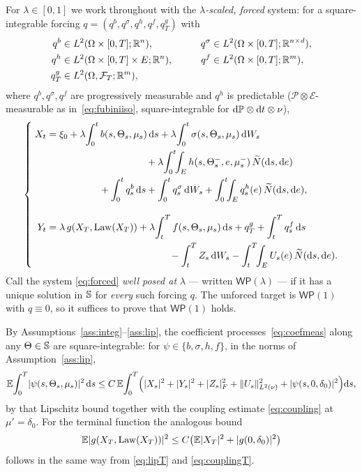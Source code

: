 For $\lambda\in[0,1]$ we work throughout with the \emph{$\lambda$-scaled, forced}
system: for a square-integrable forcing
$q=(q^b,q^\sigma,q^h,q^f,q^g_T)$ with
\[
\begin{aligned}
q^b&\in L^2(\Omega\times[0,T];\mathbb{R}^n),
&\qquad q^\sigma&\in L^2(\Omega\times[0,T];\mathbb{R}^{n\times d}),\\
q^h&\in L^2(\Omega\times[0,T]\times E;\mathbb{R}^n),
&\qquad q^f&\in L^2(\Omega\times[0,T];\mathbb{R}^m),\\
q^g_T&\in L^2(\Omega,\mathcal{F}_T;\mathbb{R}^m),
\end{aligned}
\]
where $q^b,q^\sigma,q^f$ are progressively
measurable and $q^h$ is predictable ($\mathcal P\otimes\mathcal E$-measurable as
in~\eqref{eq:fubiniiso}, square-integrable for $\mathrm{d}\mathbb{P}\otimes\mathrm{d} t\otimes\nu$),
\begin{equation}\label{eq:forced}
\left\{\;\begin{aligned}
X_t&=\xi_0+\lambda\!\int_0^t b(s,\Theta_s,\mu_s)\,\diff s
+\lambda\!\int_0^t\sigma(s,\Theta_s,\mu_s)\,\diff W_s\\
&\hspace{10.2em}+\lambda\!\int_0^t\!\!\int_E h(s,\Theta_s^-,e,\mu_s^-)\,\Nt(\diff s,\diff e)\\
&\hspace{5.4em}+\int_0^t q_s^b\,\diff s+\int_0^t q_s^\sigma\,\diff W_s
+\int_0^t\!\!\int_E q_s^h(e)\,\Nt(\diff s,\diff e),\\[2.2ex]
Y_t&=\lambda\,g(X_T,\Law(X_T))+\lambda\!\int_t^T f(s,\Theta_s,\mu_s)\,\diff s
+q_T^g+\int_t^T q_s^f\,\diff s\\
&\hspace{12.6em}-\int_t^T Z_s\,\diff W_s-\int_t^T\!\!\int_E U_s(e)\,\Nt(\diff s,\diff e).
\end{aligned}\right.
\end{equation}
Call the system \eqref{eq:forced} \emph{well posed at} $\lambda$ --- written
$\mathsf{WP}(\lambda)$ --- if it has a unique solution in $\mathbb{S}$ for \emph{every} such
forcing $q$. The unforced target is
$\mathsf{WP}(1)$ with $q\equiv0$, so it suffices to prove that
$\mathsf{WP}(1)$ holds.

By Assumptions~\ref{ass:integ}--\ref{ass:lip}, the coefficient processes~\eqref{eq:coefmeas}
along any $\Theta\in\mathbb{S}$ are square-integrable: for $\psi\in\{b,\sigma,h,f\}$, in the norms of
Assumption~\ref{ass:lip},
\begin{equation}\label{eq:coeffint}
\mathbb{E}\!\int_0^T\!|\psi(s,\Theta_s,\mu_s)|^2\,\mathrm{d} s
\le C\,\mathbb{E}\!\int_0^T\!\Big(|X_s|^2+|Y_s|^2+|Z_s|_F^2+\lVert U_s\rVert_{L^2(\nu)}^2
+|\psi(s,0,\delta_0)|^2\Big)\mathrm{d} s,
\end{equation}
by that Lipschitz bound together with the coupling estimate \eqref{eq:coupling} at
$\mu'=\delta_0$. For the terminal function the analogous bound
\begin{equation}\label{eq:termg}
\mathbb{E}|g(X_T,\mathrm{Law}(X_T))|^2\le C\big(\mathbb{E}|X_T|^2+|g(0,\delta_0)|^2\big)
\end{equation}
follows in the same way from \eqref{eq:lipT} and \eqref{eq:couplingT}.

